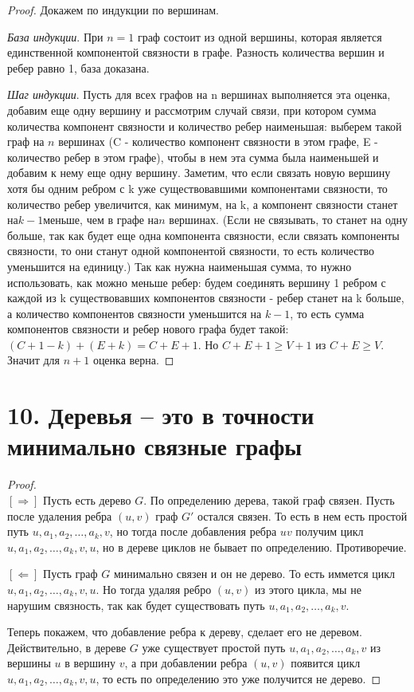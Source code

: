 \documentclass[a4paper,12pt]{article}
\begin{document}
	\begin{proof}
		Докажем по индукции по вершинам.

		\textit{База индукции}. При $n = 1$ граф состоит из одной вершины, которая является единственной компонентой связности в графе. Разность количества вершин и ребер равно 1, база доказана.

		\textit{Шаг индукции}. Пусть для всех графов на n вершинах выполняется эта оценка, добавим еще одну вершину и рассмотрим случай связи, при котором сумма количества компонент
		связности и количество ребер наименьшая: выберем такой граф на $n$ вершинах (C - количество
		компонент связности в этом графе, E - количество ребер в этом графе), чтобы в нем эта сумма
		была наименьшей и добавим к нему еще одну вершину. Заметим, что если связать новую вершину
		хотя бы одним ребром с k уже существовавшими компонентами связности, то количество ребер
		увеличится, как минимум, на k, а компонент связности станет на$ k - 1 $меньше, чем в графе на$ n$
		вершинах. (Если не связывать, то станет на одну больше, так как будет еще одна компонента
		связности, если связать компоненты связности, то они станут одной компонентой связности, то
		есть количество уменьшится на единицу.) Так как нужна наименьшая сумма, то нужно
		использовать, как можно меньше ребер: будем соединять вершину 1 ребром с каждой из k существовавших компонентов связности - ребер станет на k больше, а количество компонентов
		связности уменьшится на $k - 1$, то есть сумма компонентов связности и ребер нового графа будет
		такой: $(C + 1 - k) + (E + k) = C + E + 1$. Но $ C + E + 1 \geq V + 1 $ из $ C + E \geq V$. Значит для $n + 1$ 		оценка верна.
	\end{proof}


    \section*{10. Деревья -- это в точности минимально связные графы}
    \begin{proof}\ \\
            $[\Rightarrow]$ Пусть есть дерево $G$. По определению дерева, такой граф связен. Пусть после удаления ребра $(u,v)$ граф $G'$ остался связен. То есть в нем есть простой путь $u, a_{1}, a_{2}, \ldots, a_{k}, v$, но тогда после добавления ребра $uv$ получим цикл $u, a_{1}, a_{2}, \ldots, a_{k}, v, u$, но в дереве циклов не бывает по определению. Противоречие.

            \noindent$[\Leftarrow]$ Пусть граф $G$ минимально связен и он не дерево. То есть иммется цикл $u, a_{1}, a_{2}, \ldots, a_{k}, v, u$. Но тогда удаляя ребро $(u, v)$ из этого цикла, мы не нарушим связность, так как будет существовать путь $u, a_{1}, a_{2}, \ldots, a_{k}, v$.

            \noindent Теперь покажем, что добавление ребра к дереву, сделает его не деревом. Действительно, в дереве $G$ уже существует простой путь $u, a_{1}, a_{2}, \ldots, a_{k}, v$ из вершины $u$ в вершину $v$, а при добавлении ребра $(u, v)$ появится цикл $u, a_{1}, a_{2}, \ldots, a_{k}, v, u$, то есть по определению это уже получится не дерево.
    \end{proof}
\end{document}
